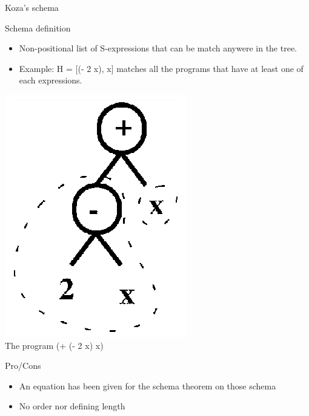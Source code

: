 \begin{frame}{Koza's schema}
  \begin{block}{Schema definition}
    \begin{itemize}
      \item Non-positional list of S-expressions that can be match anywere in the tree.\cite{Koza92}
      \item Example: H = [(- 2 x), x] matches all the programs that have at least one of each expressions.
    \end{itemize}
  \end{block}
  
  \begin{center}
    \includegraphics[scale=0.90]{img/schemak}\\
    The program (+ (- 2 x) x)
  \end{center}

  \begin{block}{Pro/Cons}
    \begin{itemize}
      \item<pro@1> An equation has been given for the schema theorem on those schema
      \item<con@1> No order nor defining length
    \end{itemize}
  \end{block}

\end{frame}

